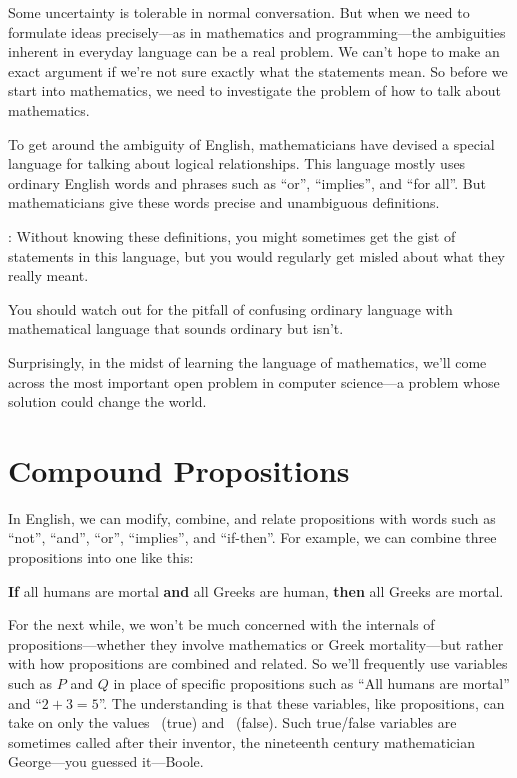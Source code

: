 Some uncertainty is tolerable in normal conversation.  But when we need to
formulate ideas precisely---as in mathematics and programming---the
ambiguities inherent in everyday language can be a real problem.  We can't
hope to make an exact argument if we're not sure exactly what the
statements mean.  So before we start into mathematics, we need to
investigate the problem of how to talk about mathematics.

To get around the ambiguity of English, mathematicians have devised a
special language for talking about logical
relationships.  This language mostly uses ordinary English words and
phrases such as ``or'', ``implies'', and ``for all''.  But mathematicians
 give these words
precise and unambiguous definitions.
\begin{editingnotes}
: Without knowing these
  definitions, you might sometimes get the gist of statements in this
  language, but you would regularly get misled about what they really
  meant.
\end{editingnotes}
You should watch out for the pitfall of confusing ordinary language with
mathematical language that sounds ordinary but isn't.

Surprisingly, in the midst of learning the language of mathematics, we'll
come across the most important open problem in computer science---a
problem whose solution could change the world.

\section{Compound Propositions}

In English, we can modify, combine, and relate propositions with words
such as ``not'', ``and'', ``or'', ``implies'', and ``if-then''.
For example, we can combine three propositions into one like this:
%
\begin{center}
\textbf{If} all humans are mortal \textbf{and} all Greeks are human,
\textbf{then} all Greeks are mortal.
\end{center}

For the next while, we won't be much concerned with the internals of
propositions---whether they involve mathematics or Greek mortality---but
rather with how propositions are combined and related.  So we'll
frequently use variables such as $P$ and $Q$ in place of specific
propositions such as ``All humans are mortal'' and ``$2 + 3 = 5$''.  The
understanding is that these variables, like propositions, can take on only
the values \true ~(true) and \false ~(false).  Such true/false variables
are sometimes called  after their inventor, the
 nineteenth century mathematician George---you
guessed it---Boole.

